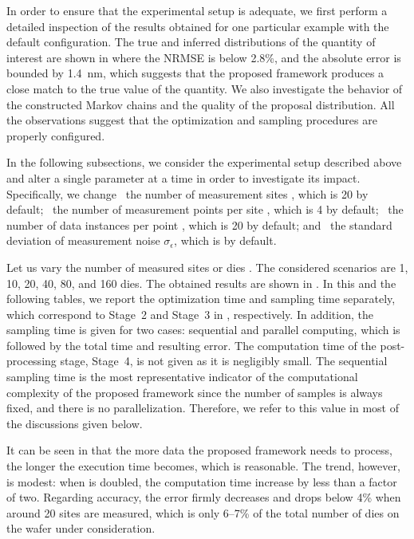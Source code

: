 In order to ensure that the experimental setup is adequate, we first perform a
detailed inspection of the results obtained for one particular example with the
default configuration. The true and inferred distributions of the quantity of
interest are shown in  where the \ac{NRMSE}
is below 2.8\%, and the absolute error is bounded by 1.4~nm, which suggests that
the proposed framework produces a close match to the true value of the quantity.
We also investigate the behavior of the constructed Markov chains and the
quality of the proposal distribution. All the observations suggest that the
optimization and sampling procedures are properly configured.

In the following subsections, we consider the experimental setup described above
and alter a single parameter at a time in order to investigate its impact.
Specifically, we change \one~the number of measurement sites \hnd, which is 20
by default; \two~the number of measurement points per site \np, which is 4 by
default; \three~the number of data instances per point \ns, which is 20 by
default; and \four~the standard deviation of measurement noise
$\sigma_\epsilon$, which is  by default.


Let us vary the number of measured sites or dies \hnd. The considered scenarios
are 1, 10, 20, 40, 80, and 160 dies. The obtained results are shown in
. In this and the following tables, we report the optimization
time and sampling time separately, which correspond to Stage~2 and Stage~3 in
, respectively. In addition, the sampling time is given for
two cases: sequential and parallel computing, which is followed by the total
time and resulting error. The computation time of the post-processing stage,
Stage~4, is not given as it is negligibly small. The sequential sampling time is
the most representative indicator of the computational complexity of the
proposed framework since the number of samples is always fixed, and there is no
parallelization. Therefore, we refer to this value in most of the discussions
given below.

It can be seen in  that the more data the proposed framework
needs to process, the longer the execution time becomes, which is reasonable.
The trend, however, is modest: when \hnd is doubled, the computation time
increase by less than a factor of two. Regarding accuracy, the error firmly
decreases and drops below 4\% when around 20 sites are measured, which is only
6--7\% of the total number of dies on the wafer under consideration.

